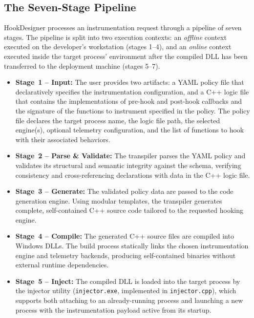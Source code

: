 \subsection{The Seven-Stage Pipeline}
\label{subsec:pipeline}

HookDesigner processes an instrumentation request through a pipeline of seven stages.
The pipeline is split into two execution contexts: an \emph{offline} context executed on the developer's workstation (stages 1--4), and an \emph{online} context executed inside the target process' environment after the compiled \ac{DLL} has been transferred to the deployment machine (stages 5--7).

\begin{itemize}
	\item \textbf{Stage~1 -- Input:}
	The user provides two artifacts: a YAML policy file that declaratively specifies the instrumentation configuration, and a C++ logic file that contains the implementations of pre-hook and post-hook callbacks and the signature of the functions to instrument specified in the policy.
	The policy file declares the target process name, the logic file path, the selected engine(s), optional telemetry configuration, and the list of functions to hook with their associated behaviors.
	
	\item \textbf{Stage~2 -- Parse \& Validate:}
	The transpiler parses the YAML policy and validates its structural and semantic integrity against the schema, verifying consistency and cross-referencing declarations with data in the C++ logic file.
	
	\item \textbf{Stage~3 -- Generate:}
	The validated policy data are passed to the code generation engine. Using modular templates, the transpiler generates complete, self-contained C++ source code tailored to the requested hooking engine.
	
	\item \textbf{Stage~4 -- Compile:}
	The generated C++ source files are compiled into Windows \acp{DLL}. The build process statically links the chosen instrumentation engine and telemetry backends, producing self-contained binaries without external runtime dependencies.
	
	\item \textbf{Stage~5 -- Inject:}
	The compiled \ac{DLL} is loaded into the target process by the injector utility (\texttt{injector.exe}, implemented in \texttt{injector.cpp}), which supports both attaching to an already-running process and launching a new process with the instrumentation payload active from its startup.
	

\end{itemize}
